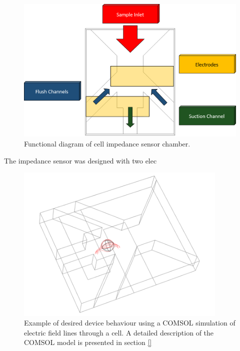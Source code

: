 \begin{figure}[h]
    \centering
    \includegraphics[width=\textwidth]{images/josh_steph_design.png}
    \caption{Functional diagram of cell impedance sensor chamber.}
    \label{fig:josh-steph_functional_diagram}
\end{figure}

\par The impedance sensor was designed with two elec

\begin{figure}[h]
    \centering
    \includegraphics[width=0.9\textwidth]{images/josh_steph_sim.png}
    \caption{Example of desired device behaviour using a COMSOL simulation of electric field lines through a cell. A detailed description of the COMSOL model is presented in section \ref{}}
    \label{fig:josh-steph_sim}
\end{figure}


